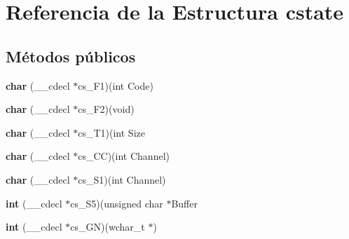 \hypertarget{structcstate}{
\section{Referencia de la Estructura cstate}
\label{structcstate}
}
\subsection*{Métodos públicos}
\begin{DoxyCompactItemize}
\item 
\hypertarget{structcstate_a607eca86d251f1e6c36ed12451f37b5f}{
{\bfseries char} (\_\-\_\-cdecl $\ast$cs\_\-F1)(int Code)}
\label{structcstate_a607eca86d251f1e6c36ed12451f37b5f}

\item 
\hypertarget{structcstate_a3e739aa789659b276b90817d5bff5b20}{
{\bfseries char} (\_\-\_\-cdecl $\ast$cs\_\-F2)(void)}
\label{structcstate_a3e739aa789659b276b90817d5bff5b20}

\item 
\hypertarget{structcstate_aef36bcbe67fb44f4e16a68ae67496743}{
{\bfseries char} (\_\-\_\-cdecl $\ast$cs\_\-T1)(int Size}
\label{structcstate_aef36bcbe67fb44f4e16a68ae67496743}

\item 
\hypertarget{structcstate_a2cd336947041bc67950d679c4243d5a9}{
{\bfseries char} (\_\-\_\-cdecl $\ast$cs\_\-CC)(int Channel)}
\label{structcstate_a2cd336947041bc67950d679c4243d5a9}

\item 
\hypertarget{structcstate_a540220e2e32044d9346e3ee12b0b34d8}{
{\bfseries char} (\_\-\_\-cdecl $\ast$cs\_\-S1)(int Channel)}
\label{structcstate_a540220e2e32044d9346e3ee12b0b34d8}

\item 
\hypertarget{structcstate_a7ace7606c75b99e1457c9f9d58af2924}{
{\bfseries int} (\_\-\_\-cdecl $\ast$cs\_\-S5)(unsigned char $\ast$Buffer}
\label{structcstate_a7ace7606c75b99e1457c9f9d58af2924}

\item 
\hypertarget{structcstate_ac467c6f1877c001ef9119312231adf42}{
{\bfseries int} (\_\-\_\-cdecl $\ast$cs\_\-GN)(wchar\_\-t $\ast$)}
\label{structcstate_ac467c6f1877c001ef9119312231adf42}

\end{DoxyCompactItemize}
